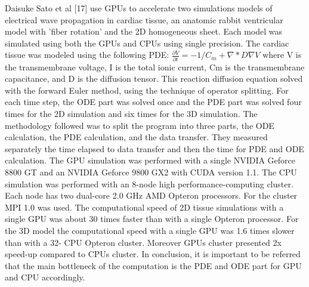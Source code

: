Daisuke Sato et al [17] use GPUs to accelerate two simulations models of electrical wave propagation in cardiac tissue, an anatomic rabbit ventricular model with 'fiber rotation' and the 2D homogeneous sheet. Each model was simulated using both the GPUs and CPUs using single precision. The cardiac tissue was modeled using the following PDE: 
$\frac{\partial V}{\partial t} = - 1/C_m  +\nabla * D \nabla V$ where V is the transmembrane voltage, I is the total ionic current, Cm is the transmembrane capacitance, and D is the diffusion tensor. This reaction diffusion equation solved with the forward Euler method, using the technique of operator splitting. For each time step, the ODE part was solved once and the PDE part was solved four times for the 2D simulation and six times for the 3D simulation. The methodology followed was to split the program into three parts, the ODE calculation, the PDE calculation, and the data transfer. They measured separately the time elapsed to data transfer and then the time for PDE and ODE calculation. The GPU simulation was performed with a single NVIDIA Geforce 8800 GT and an NVIDIA Geforce 9800 GX2 with CUDA version 1.1. The CPU simulation was performed with an 8-node high performance-computing cluster. Each node has two dual-core 2.0 GHz AMD Opteron processors. For the cluster MPI 1.0 was used. The computational speed of 2D tissue simulations with a single GPU was about 30 times faster than with a single Opteron processor. For the 3D model the computational speed with a single GPU was 1.6 times slower than with a 32- CPU Opteron cluster. Moreover GPUs cluster presented 2x speed-up compared to CPUs cluster. In conclusion, it is important to be referred that the main bottleneck of the computation is the PDE and ODE part for GPU and CPU accordingly.

